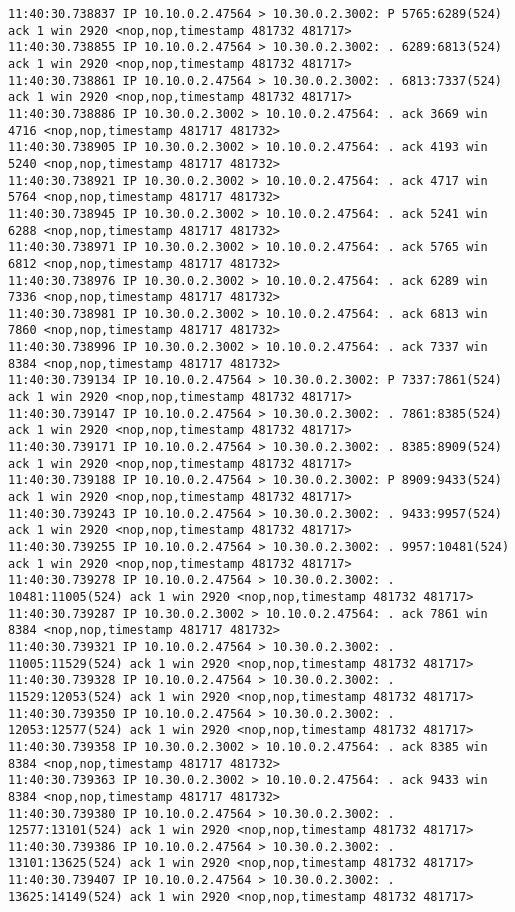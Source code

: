 \documentclass[a4paper,12pt]{article}
\begin{document}
\begin{lstlisting}
11:40:30.738837 IP 10.10.0.2.47564 > 10.30.0.2.3002: P 5765:6289(524) ack 1 win 2920 <nop,nop,timestamp 481732 481717>
11:40:30.738855 IP 10.10.0.2.47564 > 10.30.0.2.3002: . 6289:6813(524) ack 1 win 2920 <nop,nop,timestamp 481732 481717>
11:40:30.738861 IP 10.10.0.2.47564 > 10.30.0.2.3002: . 6813:7337(524) ack 1 win 2920 <nop,nop,timestamp 481732 481717>
11:40:30.738886 IP 10.30.0.2.3002 > 10.10.0.2.47564: . ack 3669 win 4716 <nop,nop,timestamp 481717 481732>
11:40:30.738905 IP 10.30.0.2.3002 > 10.10.0.2.47564: . ack 4193 win 5240 <nop,nop,timestamp 481717 481732>
11:40:30.738921 IP 10.30.0.2.3002 > 10.10.0.2.47564: . ack 4717 win 5764 <nop,nop,timestamp 481717 481732>
11:40:30.738945 IP 10.30.0.2.3002 > 10.10.0.2.47564: . ack 5241 win 6288 <nop,nop,timestamp 481717 481732>
11:40:30.738971 IP 10.30.0.2.3002 > 10.10.0.2.47564: . ack 5765 win 6812 <nop,nop,timestamp 481717 481732>
11:40:30.738976 IP 10.30.0.2.3002 > 10.10.0.2.47564: . ack 6289 win 7336 <nop,nop,timestamp 481717 481732>
11:40:30.738981 IP 10.30.0.2.3002 > 10.10.0.2.47564: . ack 6813 win 7860 <nop,nop,timestamp 481717 481732>
11:40:30.738996 IP 10.30.0.2.3002 > 10.10.0.2.47564: . ack 7337 win 8384 <nop,nop,timestamp 481717 481732>
11:40:30.739134 IP 10.10.0.2.47564 > 10.30.0.2.3002: P 7337:7861(524) ack 1 win 2920 <nop,nop,timestamp 481732 481717>
11:40:30.739147 IP 10.10.0.2.47564 > 10.30.0.2.3002: . 7861:8385(524) ack 1 win 2920 <nop,nop,timestamp 481732 481717>
11:40:30.739171 IP 10.10.0.2.47564 > 10.30.0.2.3002: . 8385:8909(524) ack 1 win 2920 <nop,nop,timestamp 481732 481717>
11:40:30.739188 IP 10.10.0.2.47564 > 10.30.0.2.3002: P 8909:9433(524) ack 1 win 2920 <nop,nop,timestamp 481732 481717>
11:40:30.739243 IP 10.10.0.2.47564 > 10.30.0.2.3002: . 9433:9957(524) ack 1 win 2920 <nop,nop,timestamp 481732 481717>
11:40:30.739255 IP 10.10.0.2.47564 > 10.30.0.2.3002: . 9957:10481(524) ack 1 win 2920 <nop,nop,timestamp 481732 481717>
11:40:30.739278 IP 10.10.0.2.47564 > 10.30.0.2.3002: . 10481:11005(524) ack 1 win 2920 <nop,nop,timestamp 481732 481717>
11:40:30.739287 IP 10.30.0.2.3002 > 10.10.0.2.47564: . ack 7861 win 8384 <nop,nop,timestamp 481717 481732>
11:40:30.739321 IP 10.10.0.2.47564 > 10.30.0.2.3002: . 11005:11529(524) ack 1 win 2920 <nop,nop,timestamp 481732 481717>
11:40:30.739328 IP 10.10.0.2.47564 > 10.30.0.2.3002: . 11529:12053(524) ack 1 win 2920 <nop,nop,timestamp 481732 481717>
11:40:30.739350 IP 10.10.0.2.47564 > 10.30.0.2.3002: . 12053:12577(524) ack 1 win 2920 <nop,nop,timestamp 481732 481717>
11:40:30.739358 IP 10.30.0.2.3002 > 10.10.0.2.47564: . ack 8385 win 8384 <nop,nop,timestamp 481717 481732>
11:40:30.739363 IP 10.30.0.2.3002 > 10.10.0.2.47564: . ack 9433 win 8384 <nop,nop,timestamp 481717 481732>
11:40:30.739380 IP 10.10.0.2.47564 > 10.30.0.2.3002: . 12577:13101(524) ack 1 win 2920 <nop,nop,timestamp 481732 481717>
11:40:30.739386 IP 10.10.0.2.47564 > 10.30.0.2.3002: . 13101:13625(524) ack 1 win 2920 <nop,nop,timestamp 481732 481717>
11:40:30.739407 IP 10.10.0.2.47564 > 10.30.0.2.3002: . 13625:14149(524) ack 1 win 2920 <nop,nop,timestamp 481732 481717>


\end{lstlisting}
\end{document}
